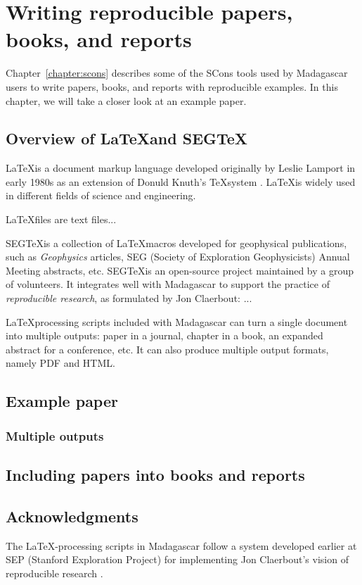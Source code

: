 \chapter{Writing reproducible papers, books, and reports}

Chapter~\ref{chapter:scons} describes some of the SCons tools used by
Madagascar users to write papers, books, and reports with reproducible
examples. In this chapter, we will take a closer look at an example paper.

\section{Overview of \LaTeX and SEG\TeX}

\LaTeX is a document markup language developed originally by Leslie
Lamport in early 1980s \cite[]{latex} as an extension of Donuld
Knuth's \TeX system \cite[]{tex}. \LaTeX is widely used in different
fields of science and engineering.

\LaTeX files are text files...

SEG\TeX is a collection of \LaTeX macros developed for geophysical
publications, such as \emph{Geophysics} articles, SEG (Society of
Exploration Geophysicists) Annual Meeting abstracts, etc. SEG\TeX is
an open-source project maintained by a group of volunteers. It
integrates well with Madagascar to support the practice of
\emph{reproducible research}, as formulated by Jon Claerbout: ...

\LaTeX processing scripts included with Madagascar can turn a single
document into multiple outputs: paper in a journal, chapter in a book,
an expanded abstract for a conference, etc. It can also produce
multiple output formats, namely PDF and HTML.

\section{Example paper}

\subsection{Multiple outputs}

\section{Including papers into books and reports}

\section{Acknowledgments}

The \LaTeX-processing scripts in Madagascar follow a system developed
earlier at SEP (Stanford Exploration Project) for implementing Jon
Claerbout's vision of reproducible research \cite[]{sep}.



